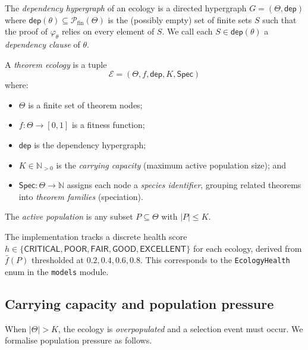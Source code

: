 \documentclass[11pt]{article}
\providecommand{\Eco}{\mathcal{E}}          %
\providecommand{\fit}{f}                    %
\providecommand{\fitbar}{\bar{f}}           %
\providecommand{\Cap}{K}                    %
\providecommand{\dep}{\mathsf{dep}}         %
\providecommand{\Spc}{\mathsf{Spec}}        %
\begin{document}
\begin{definition}\label{def:dep}
The \emph{dependency hypergraph} of an ecology is a directed
hypergraph $G = (\Theta, \dep)$ where
$\dep(\theta) \subseteq \mathcal{P}_{\mathrm{fin}}(\Theta)$ is the
(possibly empty) set of finite sets $S$ such that the proof of
$\varphi_\theta$ relies on every element of $S$.  We call each
$S \in \dep(\theta)$ a \emph{dependency clause} of $\theta$.
\end{definition}

\begin{definition}\label{def:ecology}
A \emph{theorem ecology} is a tuple
\[
  \Eco = (\Theta, \fit, \dep, \Cap, \Spc)
\]
where:
\begin{itemize}[leftmargin=1.5em]
  \item $\Theta$ is a finite set of theorem nodes;
  \item $\fit : \Theta \to [0,1]$ is a fitness function;
  \item $\dep$ is the dependency hypergraph;
  \item $\Cap \in \mathbb{N}_{>0}$ is the \emph{carrying capacity}
    (maximum active population size); and
  \item $\Spc : \Theta \to \mathbb{N}$ assigns each node a
    \emph{species identifier}, grouping related theorems into
    \emph{theorem families} (speciation).
\end{itemize}
The \emph{active population} is any subset $P \subseteq \Theta$ with
$|P| \leq \Cap$.
\end{definition}

\begin{remark}[EcologyHealth]\label{rem:health}
The implementation tracks a discrete health score
$h \in \{\mathsf{CRITICAL}, \mathsf{POOR}, \mathsf{FAIR},
\mathsf{GOOD}, \mathsf{EXCELLENT}\}$ for each ecology, derived from
$\fitbar(P)$ thresholded at $0.2, 0.4, 0.6, 0.8$.  This corresponds
to the \texttt{EcologyHealth} enum in the \texttt{models} module.
\end{remark}

\subsection{Carrying capacity and population pressure}

When $|\Theta| > \Cap$, the ecology is \emph{overpopulated} and a
selection event must occur.  We formalise population pressure as
follows.
\end{document}
